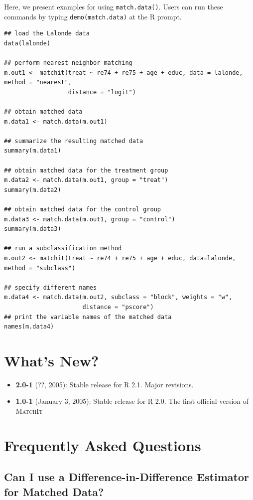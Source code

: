 \documentclass[oneside,letterpaper,titlepage]{article}
\newcommand{\MatchIt}{\textsc{MatchIt}}
\begin{document}
Here, we present examples for using {\tt match.data()}. Users can run
these commands by typing {\tt demo(match.data)} at the R prompt.
\begin{verbatim}
## load the Lalonde data
data(lalonde)

## perform nearest neighbor matching
m.out1 <- matchit(treat ~ re74 + re75 + age + educ, data = lalonde, method = "nearest",  
                  distance = "logit")

## obtain matched data 
m.data1 <- match.data(m.out1)

## summarize the resulting matched data
summary(m.data1)

## obtain matched data for the treatment group
m.data2 <- match.data(m.out1, group = "treat")
summary(m.data2)

## obtain matched data for the control group
m.data3 <- match.data(m.out1, group = "control")
summary(m.data3)

## run a subclassification method
m.out2 <- matchit(treat ~ re74 + re75 + age + educ, data=lalonde, method = "subclass")

## specify different names
m.data4 <- match.data(m.out2, subclass = "block", weights = "w",
                      distance = "pscore")
## print the variable names of the matched data
names(m.data4)
\end{verbatim}





\section{What's New?}

\begin{itemize}
\item \textbf{2.0-1} (??, 2005): Stable release for R 2.1. Major revisions.
\item \textbf{1.0-1} (January 3, 2005): Stable release for R 2.0. The
  first official version of \MatchIt
\end{itemize}




\section{Frequently Asked Questions}

\subsection{Can I use a Difference-in-Difference Estimator for Matched
  Data?}
\end{document}

